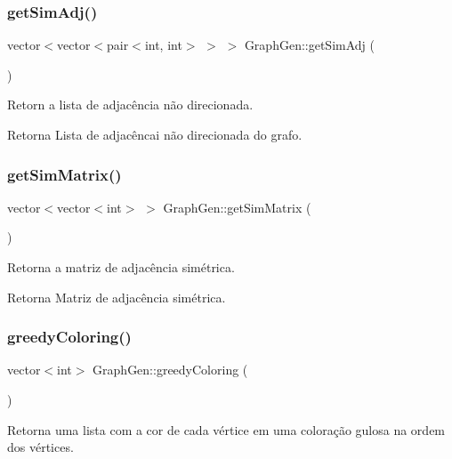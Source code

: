 \subsubsection{\texorpdfstring{get\+Sim\+Adj()}{getSimAdj()}}
{\footnotesize\ttfamily vector$<$vector$<$pair$<$int, int$>$ $>$ $>$ Graph\+Gen\+::get\+Sim\+Adj (\begin{DoxyParamCaption}{ }\end{DoxyParamCaption})}

Retorn a lista de adjacência não direcionada. \begin{DoxyReturn}{Retorna}
Lista de adjacêncai não direcionada do grafo. 
\end{DoxyReturn}
\mbox{\label{classGraphGen_ab2f8872fc9fab4268ad999dd89e1d4fa}} 
\subsubsection{\texorpdfstring{get\+Sim\+Matrix()}{getSimMatrix()}}
{\footnotesize\ttfamily vector$<$vector$<$int$>$ $>$ Graph\+Gen\+::get\+Sim\+Matrix (\begin{DoxyParamCaption}{ }\end{DoxyParamCaption})}

Retorna a matriz de adjacência simétrica. \begin{DoxyReturn}{Retorna}
Matriz de adjacência simétrica. 
\end{DoxyReturn}
\mbox{\label{classGraphGen_a8505ba4cbaa0685f43e52a4c4f296dc1}} 
\subsubsection{\texorpdfstring{greedy\+Coloring()}{greedyColoring()}\hspace{0.1cm}{\footnotesize\ttfamily [1/2]}}
{\footnotesize\ttfamily vector$<$int$>$ Graph\+Gen\+::greedy\+Coloring (\begin{DoxyParamCaption}{ }\end{DoxyParamCaption})}

Retorna uma lista com a cor de cada vértice em uma coloração gulosa na ordem dos vértices.

